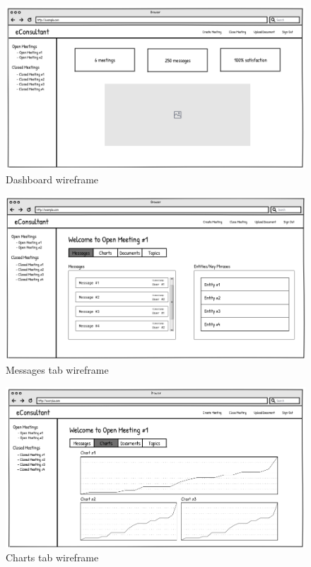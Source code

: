 \documentclass{article}
\begin{document}
\begin{figure}[H]
  \centering
  \includegraphics[scale=0.57]{img/home.png}
  \caption{Dashboard wireframe}
  \label{fig:Home Page}
\end{figure}

\begin{figure}[H]
  \centering
  \includegraphics[scale=0.57]{img/messages.png}
  \caption{Messages tab wireframe}
  \label{fig:Messages tab}
\end{figure}

\begin{figure}[H]
  \centering
  \includegraphics[scale=0.57]{img/charts.png}
  \caption{Charts tab wireframe}
  \label{fig:Charts tab}
\end{figure}
\end{document}
